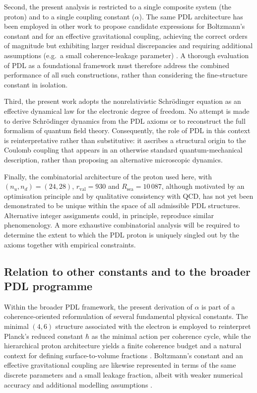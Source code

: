 \documentclass[11pt,a4paper]{article}
\theoremstyle{plain}
\theoremstyle{definition}
\theoremstyle{remark}
\begin{document}
Second, the present analysis is restricted to a single composite system (the proton) and to a single coupling constant (\(\alpha\)). The same PDL architecture has been employed in other work to propose candidate expressions for Boltzmann’s constant and for an effective gravitational coupling, achieving the correct orders of magnitude but exhibiting larger residual discrepancies and requiring additional assumptions (e.g.\ a small coherence-leakage parameter) \cite{Laubscher2026PDL_English,Laubscher2026LDP_French}. A thorough evaluation of PDL as a foundational framework must therefore address the combined performance of all such constructions, rather than considering the fine-structure constant in isolation.

Third, the present work adopts the nonrelativistic Schrödinger equation as an effective dynamical law for the electronic degree of freedom. No attempt is made to derive Schrödinger dynamics from the PDL axioms or to reconstruct the full formalism of quantum field theory. Consequently, the role of PDL in this context is reinterpretative rather than substitutive: it ascribes a structural origin to the Coulomb coupling that appears in an otherwise standard quantum-mechanical description, rather than proposing an alternative microscopic dynamics.

Finally, the combinatorial architecture of the proton used here, with \((n_u,n_d) = (24,28)\), \(r_{\mathrm{val}} = 930\) and \(R_{\mathrm{sea}} = 10\,087\), although motivated by an optimisation principle and by qualitative consistency with QCD, has not yet been demonstrated to be unique within the space of all admissible PDL structures. Alternative integer assignments could, in principle, reproduce similar phenomenology. A more exhaustive combinatorial analysis will be required to determine the extent to which the PDL proton is uniquely singled out by the axioms together with empirical constraints.

\subsection{Relation to other constants and to the broader PDL programme}

Within the broader PDL framework, the present derivation of \(\alpha\) is part of a coherence-oriented reformulation of several fundamental physical constants. The minimal \((4,6)\) structure associated with the electron is employed to reinterpret Planck’s reduced constant \(\hbar\) as the minimal action per coherence cycle, while the hierarchical proton architecture yields a finite coherence budget and a natural context for defining surface-to-volume fractions \cite{Laubscher2026IntroPDL,Laubscher2026PDL_English}. Boltzmann’s constant and an effective gravitational coupling are likewise represented in terms of the same discrete parameters and a small leakage fraction, albeit with weaker numerical accuracy and additional modelling assumptions \cite{Laubscher2026PDL_English,Laubscher2026LDP_French}.
\end{document}
